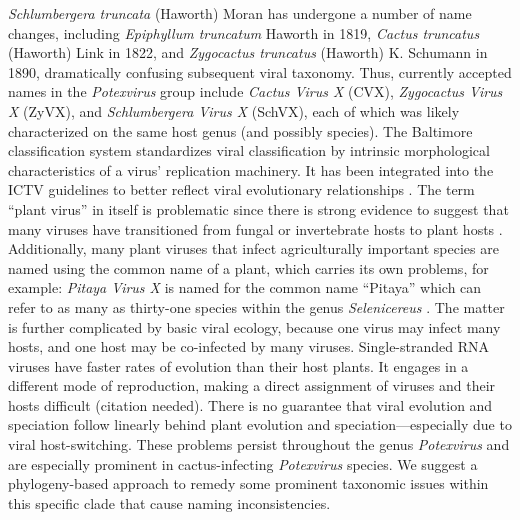 \documentclass[fleqn,10pt,lineno]{wlpeerj}
\begin{document}
\textit{Schlumbergera truncata} (Haworth) Moran has undergone a number of name changes, including \textit{Epiphyllum truncatum} Haworth in 1819, \textit{Cactus truncatus} (Haworth) Link in 1822, and \textit{Zygocactus truncatus} (Haworth) K. Schumann in 1890, dramatically confusing subsequent viral taxonomy.
Thus, currently accepted names in the \textit{Potexvirus} group include \textit{Cactus Virus X} (CVX), \textit{Zygocactus Virus X} (ZyVX), and \textit{Schlumbergera Virus X} (SchVX), each of which was likely characterized on the same host genus (and possibly species). %
The Baltimore classification system standardizes viral classification by intrinsic morphological characteristics of a virus' replication machinery. 
It has been integrated into the ICTV guidelines to better reflect viral evolutionary relationships \citep{ictv2020}.
The term ``plant virus'' in itself is problematic since there is strong evidence to suggest that many viruses have transitioned from fungal or invertebrate hosts to plant hosts \citep{lefeuvre_evolution_2019}. %
Additionally, many plant viruses that infect agriculturally important species are named using the common name of a plant, which carries its own problems, for example: \textit{Pitaya Virus X} is named for the common name ``Pitaya'' which can refer to as many as thirty-one species within the genus \textit{Selenicereus} \citep{korotkova_phylogenetic_2017,guerrero_phylogenetic_2019,le_bellec_12_2011}. 
The matter is further complicated by basic viral ecology, because one virus may infect many hosts, and one host may be co-infected by many viruses. 
Single-stranded RNA viruses have faster rates of evolution than their host plants. %
It engages in a different mode of reproduction, making a direct assignment of viruses and their hosts difficult (citation needed).%
There is no guarantee that viral evolution and speciation follow linearly behind plant evolution and speciation---especially due to viral host-switching.
These problems persist throughout the genus \textit{Potexvirus} and are especially prominent in cactus-infecting \textit{Potexvirus} species.
We suggest a phylogeny-based approach to remedy some prominent taxonomic issues within this specific clade that cause naming inconsistencies.
\end{document}
